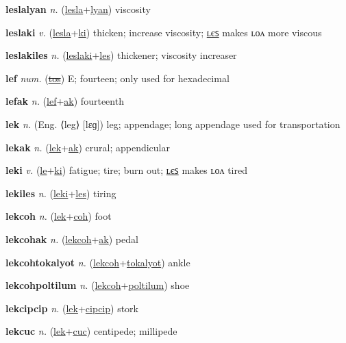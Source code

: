 \textbf{\hypertarget{leslalyan}{leslalyan}} \textit{n.} (\hyperlink{lesla}{lesla}+\allowbreak \hyperlink{lyan}{lyan})
viscosity

\textbf{\hypertarget{leslaki}{leslaki}} \textit{v.} (\hyperlink{lesla}{lesla}+\allowbreak \hyperlink{ki}{ki})
thicken; increase viscosity; \hyperlink{leslakiles}{ʟєꜱ} makes ʟᴏᴧ more viscous

\textbf{\hypertarget{leslakiles}{leslakiles}} \textit{n.} (\hyperlink{leslaki}{leslaki}+\allowbreak \hyperlink{les}{les})
thickener; viscosity increaser

\textbf{\hypertarget{lef}{lef}} \textit{num.} (\hyperlink{tos}{\sout{tos}})
E; fourteen; only used for hexadecimal

\textbf{\hypertarget{lefak}{lefak}} \textit{n.} (\hyperlink{lef}{lef}+\allowbreak \hyperlink{ak}{ak})
fourteenth

\textbf{\hypertarget{lek}{lek}} \textit{n.} (Eng. ⟨leg⟩ [lɛɡ])
leg; appendage; long appendage used for transportation

\textbf{\hypertarget{lekak}{lekak}} \textit{n.} (\hyperlink{lek}{lek}+\allowbreak \hyperlink{ak}{ak})
crural; appendicular

\textbf{\hypertarget{leki}{leki}} \textit{v.} (\hyperlink{le}{le}+\allowbreak \hyperlink{ki}{ki})
fatigue; tire; burn out; \hyperlink{lekiles}{ʟєꜱ} makes ʟᴏᴧ tired

\textbf{\hypertarget{lekiles}{lekiles}} \textit{n.} (\hyperlink{leki}{leki}+\allowbreak \hyperlink{les}{les})
tiring

\textbf{\hypertarget{lekcoh}{lekcoh}} \textit{n.} (\hyperlink{lek}{lek}+\allowbreak \hyperlink{coh}{coh})
foot

\textbf{\hypertarget{lekcohak}{lekcohak}} \textit{n.} (\hyperlink{lekcoh}{lekcoh}+\allowbreak \hyperlink{ak}{ak})
pedal

\textbf{\hypertarget{lekcohtokalyot}{lekcohtokalyot}} \textit{n.} (\hyperlink{lekcoh}{lekcoh}+\allowbreak \hyperlink{tokalyot}{tokalyot})
ankle

\textbf{\hypertarget{lekcohpoltilum}{lekcohpoltilum}} \textit{n.} (\hyperlink{lekcoh}{lekcoh}+\allowbreak \hyperlink{poltilum}{poltilum})
shoe

\textbf{\hypertarget{lekcipcip}{lekcipcip}} \textit{n.} (\hyperlink{lek}{lek}+\allowbreak \hyperlink{cipcip}{cipcip})
stork

\textbf{\hypertarget{lekcuc}{lekcuc}} \textit{n.} (\hyperlink{lek}{lek}+\allowbreak \hyperlink{cuc}{cuc})
centipede; millipede

